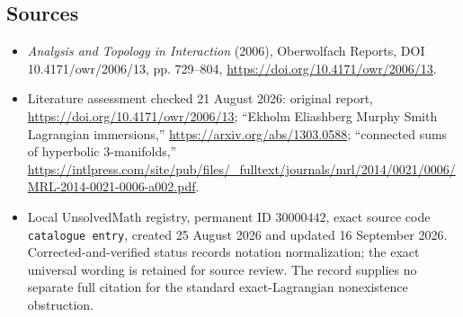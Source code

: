 \documentclass[11pt]{article}
\begin{document}
\subsection{Sources}
\begin{itemize}
\item \emph{Analysis and Topology in Interaction} (2006), Oberwolfach Reports, DOI 10.4171/owr/2006/13, pp. 729--804, \url{https://doi.org/10.4171/owr/2006/13}.
\item Literature assessment checked 21 August 2026: original report, \url{https://doi.org/10.4171/owr/2006/13}; ``Ekholm Eliashberg Murphy Smith Lagrangian immersions,'' \url{https://arxiv.org/abs/1303.0588}; ``connected sums of hyperbolic 3-manifolds,'' \url{https://intlpress.com/site/pub/files/_fulltext/journals/mrl/2014/0021/0006/MRL-2014-0021-0006-a002.pdf}.
\item Local UnsolvedMath registry, permanent ID $30000442$, exact source code \texttt{catalogue entry}, created 25 August 2026 and updated 16 September 2026. Corrected-and-verified status records notation normalization; the exact universal wording is retained for source review. The record supplies no separate full citation for the standard exact-Lagrangian nonexistence obstruction.
\end{itemize}
\end{document}
